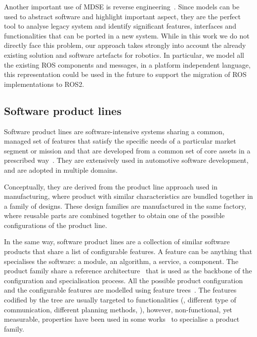 Another important use of MDSE is reverse engineering~\cite{bruneliere2010modisco, rugaber2004model}. Since models can be used to abstract software and highlight important aspect, they are the perfect tool to analyse legacy system and identify significant features, interfaces and functionalities that can be ported in a new system. While in this work we do not directly face this problem, our approach takes strongly into account the already existing solution and software artefacts for robotics. In particular, we model all the existing ROS components and messages, in a platform independent language, this representation could be used in the future to support the migration of ROS implementations to ROS2.

\subsection{Software product lines}
Software product lines are software-intensive systems sharing a common, managed set of features that satisfy the specific needs of a particular market segment or mission and that are developed from a common set of core assets in a prescribed way~\cite{northrop2002sei}. They are extensively used in automotive software development, and are adopted in multiple domains.

Conceptually, they are derived from the product line approach used in manufacturing, where product with similar characteristics are bundled together in a family of designs. These design families are manufactured in the same factory, where reusable parts are combined together to obtain one of the possible configurations of the product line.

In the same way, software product lines are a collection of similar software products that share a list of configurable features. A feature can be anything that specialises the software: a module, an algorithm, a service, a component. The product family share a reference architecture~\cite{nakagawa2011reference} that is used as the backbone of the configuration and specialisation process. All the possible product configuration and the configurable features are modelled using feature trees~\cite{mendonca2009splot, eriksson2009managing}. The features codified by the tree are usually targeted to functionalities (\eg, different type of communication, different planning methods, \etc), however, non-functional, yet measurable, properties have been used in some works~\cite{benavides2005automated} to specialise a product family.

